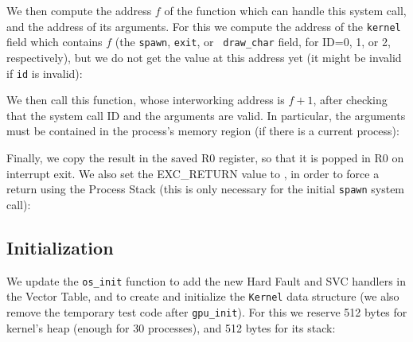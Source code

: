 We then compute the address $f$ of the function which can handle this system
call, and the address of its arguments. For this we compute the address of the
{\tt kernel} field which contains $f$ (the {\tt spawn}, {\tt exit}, or {\tt
draw\_char} field, for ID=0, 1, or 2, respectively), but we do not get the value
at this address yet (it might be invalid if {\tt id} is invalid):


We then call this function, whose interworking address is $f+1$, after checking
that the system call ID and the arguments are valid. In particular, the
arguments must be contained in the process's memory region (if there is a
current process):


Finally, we copy the result in the saved R0 register, so that it is popped in
R0 on interrupt exit. We also set the EXC\_RETURN value to
, in order to force a return using the Process Stack
(this is only necessary for the initial {\tt spawn} system call):


\subsection{Initialization}


We update the {\tt os\_init} function to add the new Hard Fault and SVC
handlers in the Vector Table, and to create and initialize the {\tt Kernel}
data structure (we also remove the temporary test code after {\tt gpu\_init}).
For this we reserve 512 bytes for kernel's heap (enough for 30 processes), and
512 bytes for its stack:

